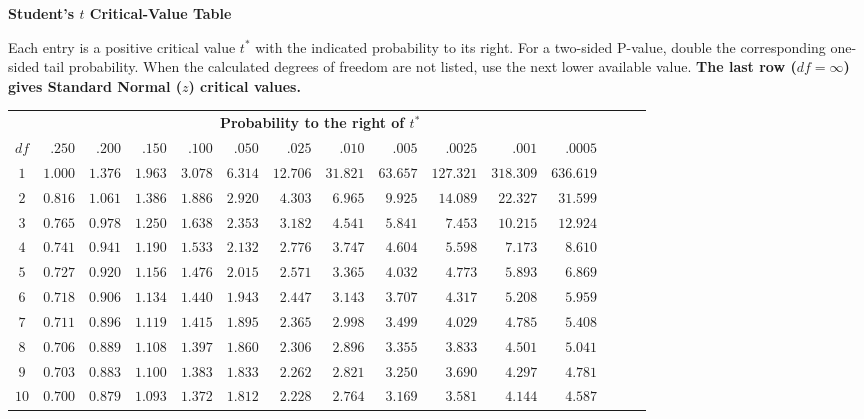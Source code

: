 \thispagestyle{plain}
\textbf{\large Student's $t$ Critical-Value Table}

Each entry is a positive critical value $t^*$ with the indicated probability to its right. For a two-sided P-value, double the corresponding one-sided tail probability. When the calculated degrees of freedom are not listed, use the next lower available value. \textbf{The last row ($df=\infty$) gives Standard Normal ($z$) critical values.}

\vspace{0.12cm}
\begin{center}
\renewcommand{\arraystretch}{1}
\setlength{\tabcolsep}{3pt}
\begin{tabular}{@{}c*{14}{r}@{}}
\toprule
& \multicolumn{11}{c}{\textbf{Probability to the right of $t^*$}} \\
\cmidrule(lr){2-12}
$df$ & $.250$ & $.200$ & $.150$ & $.100$ & $.050$ & $.025$ & $.010$ & $.005$ & $.0025$ & $.001$ & $.0005$ \\
\midrule
$1$ & $1.000$ & $1.376$ & $1.963$ & $3.078$ & $6.314$ & $12.706$ & $31.821$ & $63.657$ & $127.321$ & $318.309$ & $636.619$ \\
$2$ & $0.816$ & $1.061$ & $1.386$ & $1.886$ & $2.920$ & $4.303$ & $6.965$ & $9.925$ & $14.089$ & $22.327$ & $31.599$ \\
$3$ & $0.765$ & $0.978$ & $1.250$ & $1.638$ & $2.353$ & $3.182$ & $4.541$ & $5.841$ & $7.453$ & $10.215$ & $12.924$ \\
$4$ & $0.741$ & $0.941$ & $1.190$ & $1.533$ & $2.132$ & $2.776$ & $3.747$ & $4.604$ & $5.598$ & $7.173$ & $8.610$ \\
$5$ & $0.727$ & $0.920$ & $1.156$ & $1.476$ & $2.015$ & $2.571$ & $3.365$ & $4.032$ & $4.773$ & $5.893$ & $6.869$ \\
$6$ & $0.718$ & $0.906$ & $1.134$ & $1.440$ & $1.943$ & $2.447$ & $3.143$ & $3.707$ & $4.317$ & $5.208$ & $5.959$ \\
$7$ & $0.711$ & $0.896$ & $1.119$ & $1.415$ & $1.895$ & $2.365$ & $2.998$ & $3.499$ & $4.029$ & $4.785$ & $5.408$ \\
$8$ & $0.706$ & $0.889$ & $1.108$ & $1.397$ & $1.860$ & $2.306$ & $2.896$ & $3.355$ & $3.833$ & $4.501$ & $5.041$ \\
$9$ & $0.703$ & $0.883$ & $1.100$ & $1.383$ & $1.833$ & $2.262$ & $2.821$ & $3.250$ & $3.690$ & $4.297$ & $4.781$ \\
$10$ & $0.700$ & $0.879$ & $1.093$ & $1.372$ & $1.812$ & $2.228$ & $2.764$ & $3.169$ & $3.581$ & $4.144$ & $4.587$ \\

\end{tabular}
\end{center}
